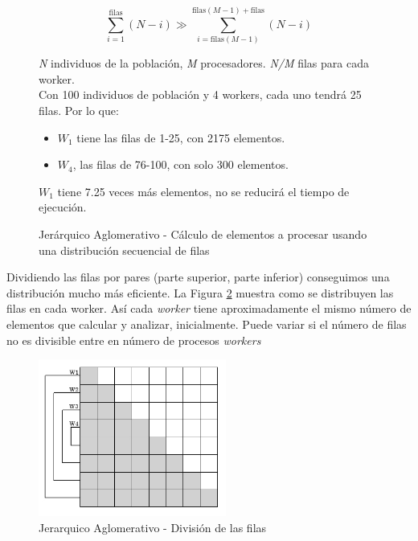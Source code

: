 		\begin{figure}[!h]		
		\begin{mdframed}[roundcorner=5pt]
			\[
			\sum_{i=1}^{\text{filas}} (N - i) \gg \sum_{i=\text{filas}(M-1)}^{\text{filas}(M-1) + \text{filas}} (N - i)
			\]
			\begin{tcolorbox}[boxrule=0.5pt, fontupper=\small]
				
				\textit{N} individuos de la población, \textit{M} procesadores. \textit{N/M} filas para cada worker.\\
				
				Con 100 individuos de población y 4 workers, cada uno tendrá 25 filas. Por lo que:
				\begin{itemize}
					\item \(W_{1}\) tiene las filas de 1-25, con 2175 elementos. 
					\item \(W_{4}\), las filas de 76-100, con solo 300 elementos. 					
				\end{itemize}
				
				\(W_{1}\) tiene 7.25 veces más elementos, no se reducirá el tiempo de ejecución.
				
							
			\end{tcolorbox}
			
		\end{mdframed}
		
		\caption{Jerárquico Aglomerativo - Cálculo de elementos a procesar usando una distribución secuencial de filas}
		\label{fig:prueba}
		\end{figure}
		
		
		Dividiendo las filas por pares (parte superior, parte inferior) conseguimos una distribución mucho más eficiente. La Figura \ref{fig:aglomerativo} muestra como se distribuyen las filas en cada worker. Así cada \textit{worker} tiene aproximadamente el mismo número de elementos que calcular y analizar, inicialmente. Puede variar si el número de filas no es divisible entre en número de procesos \textit{workers} 
		
		\begin{figure}[!h]
			\centering
			\includegraphics[width=0.55\textwidth]{images/chapter_3/aglomerativo_mpi}
			
			
			\caption{Jerarquico Aglomerativo - División de las filas}
			\label{fig:aglomerativo}
		\end{figure}
		
